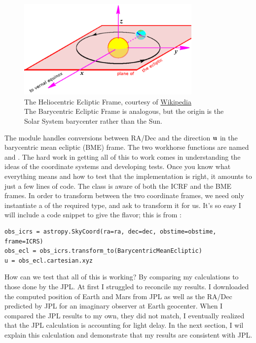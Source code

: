 \begin{figure}[hbt!]
\begin{center}
\includegraphics[width=0.8\textwidth]{../figs/web/heliocentric_ecliptic.png}
\caption[The Heliocentric Ecliptic Frame]
{The Heliocentric Ecliptic Frame, courtesy of \href{https://en.wikipedia.org/wiki/Ecliptic_coordinate_system}{Wikipedia}\\
The Barycentric Ecliptic Frame is analogous, but the origin is the Solar System barycenter rather than the Sun.}
\end{center}
\end{figure}

The module  handles conversions between RA/Dec and the direction $\mathbf{u}$ in the barycentric mean ecliptic (BME) frame.
The two workhorse functions are named  and .
The hard work in getting all of this to work comes in understanding the ideas of the coordinate systems and developing tests.
Once you know what everything means and how to test that the implementation is right, it amounts to just a few lines of code.
The  class is aware of both the ICRF and the BME frames.
In order to transform between the two coordinate frames, we need only instantiate a  of the required type, 
and ask  to transform it for us.
It's so easy I will include a code snippet to give the flavor; this is from :
\begin{lstlisting}[style=CodeSnippet]
obs_icrs = astropy.SkyCoord(ra=ra, dec=dec, obstime=obstime, frame=ICRS)
obs_ecl = obs_icrs.transform_to(BarycentricMeanEcliptic)
u = obs_ecl.cartesian.xyz
\end{lstlisting}

How can we test that all of this is working? 
By comparing my calculations to those done by the JPL.
At first I struggled to reconcile my results.
I downloaded the computed position of Earth and Mars from JPL as well as the RA/Dec predicted by JPL for an imaginary observer at Earth geocenter.
When I compared the JPL results to my own, they did not match,
I eventually realized that the JPL calculation is accounting for light delay.
In the next section, I wil explain this calculation and demonstrate that my results are consistent with JPL.

